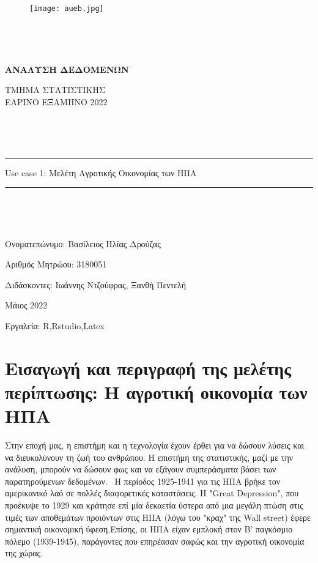 \documentclass[10pt]{article}
\begin{document}
\begin{titlepage}
\centering

\begin{figure}
    \centering
    \texttt{[image: aueb.jpg]}
    
    \label{fig:galaxy}
\end{figure}

\




\


\huge{\textbf{ΑΝΑΛΥΣΗ ΔΕΔΟΜΕΝΩΝ}} \ 




\Large{ΤΜΗΜΑ ΣΤΑΤΙΣΤΙΚΗΣ}
\\
\Large{ΕΑΡΙΝΟ ΕΞΑΜΗΝΟ 2022}
\




\



\

\rule{\textwidth}{3pt}



\huge{Use case 1: Μελέτη Αγροτικής Οικονομίας των ΗΠΑ}

\rule{\textwidth}{3pt}

\




\


\large {Ονοματεπώνυμο: Βασίλειος Ηλίας Δρούζας}

Αριθμός Μητρώου: 3180051


Διδάσκοντες: Ιωάννης Ντζούφρας, Ξανθή Πεντελή


Μάιος 2022



Εργαλεία: R,Rstudio,Latex





\end{titlepage}




\newpage

\renewcommand*\contentsname{Περιεχόμενα}
\tableofcontents

\newpage
\section{Εισαγωγή και περιγραφή της μελέτης περίπτωσης: Η αγροτική οικονομία των ΗΠΑ}

Στην εποχή μας, η επιστήμη και η τεχνολογία έχουν έρθει για να δώσουν λύσεις και να διευκολύνουν τη ζωή του ανθρώπου. Η επιστήμη της στατιστικής, μαζί με την ανάλυση, μπορούν να δώσουν φως και να εξάγουν συμπεράσματα βάσει των παρατηρούμενων δεδομένων.
\
H περίοδος 1925-1941 για τις ΗΠΑ βρήκε τον αμερικανικό λαό σε πολλές διαφορετικές καταστάσεις. Η "Great Depression", που προέκυψε το 1929 και κράτησε επί μία δεκαετία ύστερα από μια μεγάλη πτώση στις τιμές των αποθεμάτων προιόντων στις ΗΠΑ (λόγω του "κραχ" της Wall street) έφερε σημαντική οικονομική ύφεση.Επίσης, οι ΗΠΑ είχαν εμπλοκή στον Β' παγκόσμιο πόλεμο (1939-1945), παράγοντες που επηρέασαν σαφώς και την αγροτική οικονομία της χώρας.
\end{document}
